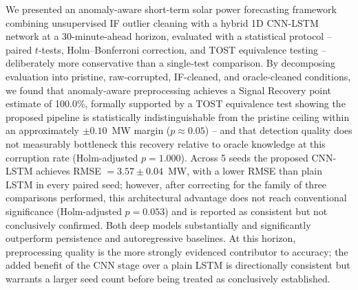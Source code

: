\documentclass[conference]{IEEEtran}
\begin{document}
We presented an anomaly-aware short-term solar power forecasting framework combining unsupervised IF outlier cleaning with a hybrid 1D CNN-LSTM network at a 30-minute-ahead horizon, evaluated with a statistical protocol -- paired $t$-tests, Holm--Bonferroni correction, and TOST equivalence testing -- deliberately more conservative than a single-test comparison. By decomposing evaluation into pristine, raw-corrupted, IF-cleaned, and oracle-cleaned conditions, we found that anomaly-aware preprocessing achieves a Signal Recovery point estimate of 100.0\%, formally supported by a TOST equivalence test showing the proposed pipeline is statistically indistinguishable from the pristine ceiling within an approximately $\pm 0.10$~MW margin ($p \approx 0.05$) -- and that detection quality does not measurably bottleneck this recovery relative to oracle knowledge at this corruption rate (Holm-adjusted $p=1.000$). Across 5 seeds the proposed CNN-LSTM achieves RMSE $=3.57\pm0.04$~MW, with a lower RMSE than plain LSTM in every paired seed; however, after correcting for the family of three comparisons performed, this architectural advantage does not reach conventional significance (Holm-adjusted $p=0.053$) and is reported as consistent but not conclusively confirmed. Both deep models substantially and significantly outperform persistence and autoregressive baselines. At this horizon, preprocessing quality is the more strongly evidenced contributor to accuracy; the added benefit of the CNN stage over a plain LSTM is directionally consistent but warrants a larger seed count before being treated as conclusively established.
\end{document}
